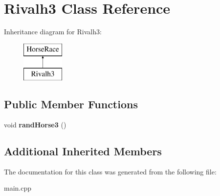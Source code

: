 \hypertarget{class_rivalh3}{\section{Rivalh3 Class Reference}
\label{class_rivalh3}
}
Inheritance diagram for Rivalh3\-:\begin{figure}[H]
\begin{center}
\leavevmode
\includegraphics[height=2.000000cm]{class_rivalh3}
\end{center}
\end{figure}
\subsection*{Public Member Functions}
\begin{DoxyCompactItemize}
\item 
\hypertarget{class_rivalh3_a2a325fe04be1bd0a15a9c05353934e52}{void {\bfseries rand\-Horse3} ()}\label{class_rivalh3_a2a325fe04be1bd0a15a9c05353934e52}

\end{DoxyCompactItemize}
\subsection*{Additional Inherited Members}


The documentation for this class was generated from the following file\-:\begin{DoxyCompactItemize}
\item 
main.\-cpp\end{DoxyCompactItemize}

